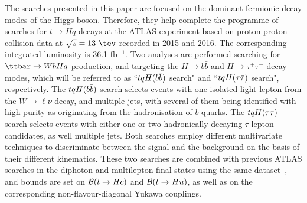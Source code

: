 
The searches presented in this paper are focused on the dominant fermionic decay modes of the Higgs boson.
Therefore, they help complete the programme of searches for $t \to Hq$ decays at the ATLAS experiment based on proton-proton collision 
data at $\sqrt{s}=13~\tev$ recorded in 2015 and 2016. The corresponding integrated luminosity is 36.1 fb$^{-1}$.
Two analyses are performed searching for $\ttbar \to WbHq$ production, and targeting the $H \to b\bar{b}$ and $H \to \tau^+\tau^-$ decay modes, 
which will be referred to as ``$tqH(b\bar{b})$ search" and ``$tqH(\tau\bar{\tau})$ search", respectively.
The $tqH(b\bar{b})$ search selects events with one isolated light lepton from the $W \to \ell\nu$ decay, and multiple jets, with several 
of them being identified with high purity as originating from the hadronisation of $b$-quarks. 
The $tqH(\tau\bar{\tau})$ search selects events with either one or two hadronically decaying $\tau$-lepton candidates, as well multiple jets. 
Both searches employ different multivariate techniques to discriminate between the signal and the background on the basis of their different kinematics. 
These two searches are combined with previous ATLAS searches in the diphoton and multilepton final states using the same dataset~\cite{Aaboud:2017mfd,Aaboud:2018pob}, 
and bounds are set on $\mathcal{B}(t\to Hc)$ and $\mathcal{B}(t\to Hu)$, as well as on the corresponding non-flavour-diagonal Yukawa couplings. 






